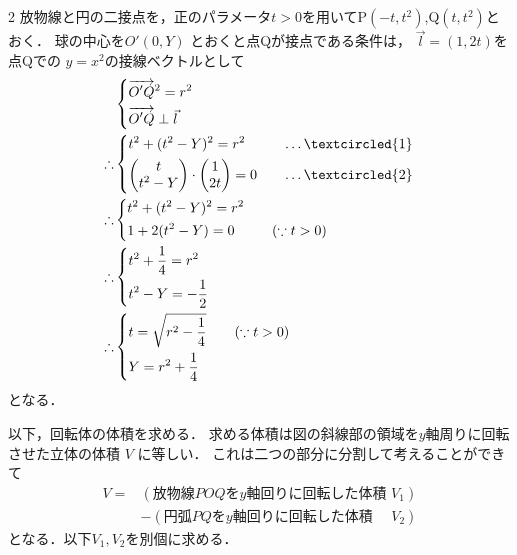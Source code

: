 \documentclass[../../main.tex]{subfiles}
\begin{document}
\begin{multicols}{2}
  放物線と円の二接点を，正のパラメータ$t>0$を用いてP$(-t,t^2)$,Q$(t,t^2)$とおく．
  球の中心を$O'(0,Y)$ とおくと点Qが接点である条件は，
  $\vec{l}=(1,2t)$を点Qでの $y=x^2$の接線ベクトルとして
  \begin{align}
    &
    \begin{dcases}
      \overrightarrow{O'Q}^2=r^2 \\
      \overrightarrow{O'Q} \perp \vec{l}
    \end{dcases}                                                                                              \\
    \therefore
    &
    \begin{dcases}
      t^2 + (t^2-Y)^2 = r^2 & \quad \dots \textcircled{1} \\
      \mqty(t                                             \\ t^2-Y) \cdot \mqty(1 \\ 2t) = 0 & \quad \dots \textcircled{2}
    \end{dcases} \\
    \therefore
    &
    \begin{dcases}
      t^2 + (t^2-Y)^2 = r^2                   \\
      1 + 2(t^2-Y) = 0 & \quad (\because t>0)
    \end{dcases}                                                                             \\
    \therefore
    &
    \begin{dcases}
      t^2 + \dfrac{1}{4} = r^2 \\
      t^2-Y = -\dfrac{1}{2}
    \end{dcases}  \label{eq:1}                                                                                   \\
    \therefore
    &
    \begin{dcases}
      t = \sqrt{r^2-\dfrac{1}{4}} & \quad (\because t>0) \\
      Y = r^2+\dfrac{1}{4}
    \end{dcases}
  \end{align}
  となる．

  以下，回転体の体積を求める．
  求める体積は図の斜線部の領域を$y$軸周りに回転させた立体の体積 $V$ に等しい．
  これは二つの部分に分割して考えることができて
  \begin{align}
    V = & (\text{放物線} POQ \text{を} y \text{軸回りに回転した体積 } V_1)                           \\
    & - (\text{円弧} PQ \text{を} y \text{軸回りに回転した体積 } \quad V_2) \label{eq:2}
  \end{align}
  となる．以下$V_1,V_2$を別個に求める．


\end{multicols}
\end{document}
